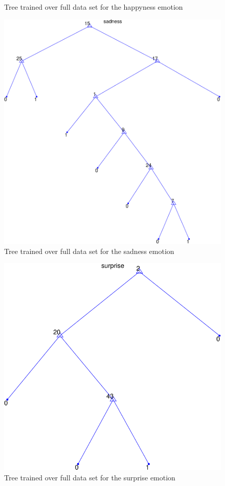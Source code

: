 \documentclass[a4paper]{article}
\begin{document}
\begin{itemize}
\begin{figure}[h]
      \caption{Tree trained over full data set for the happyness emotion}
    \end{figure}
    \begin{figure}[h]
      \centering
      \includegraphics[scale=0.5]{graph-sadness}
      \caption{Tree trained over full data set for the sadness emotion}
    \end{figure}
    \begin{figure}[h]
      \centering
      \includegraphics[scale=0.5]{graph-surprise}
      \caption{Tree trained over full data set for the surprise emotion}
    \end{figure}



\end{itemize}
\end{document}
